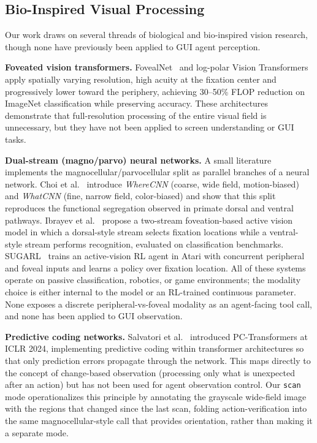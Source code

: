 \documentclass[11pt,a4paper]{article}
\begin{document}
\subsection{Bio-Inspired Visual Processing}
\label{sec:rw-bio-inspired}

Our work draws on several threads of biological and bio-inspired vision research, though none have previously been applied to GUI agent perception.

\textbf{Foveated vision transformers.} FovealNet~\cite{fovealnet} and log-polar Vision Transformers~\cite{logpolar-vit} apply spatially varying resolution, high acuity at the fixation center and progressively lower toward the periphery, achieving 30--50\% FLOP reduction on ImageNet classification while preserving accuracy. These architectures demonstrate that full-resolution processing of the entire visual field is unnecessary, but they have not been applied to screen understanding or GUI tasks.

\textbf{Dual-stream (magno/parvo) neural networks.} A small literature implements the magnocellular/parvocellular split as parallel branches of a neural network. Choi et al.~\cite{choi-dualstream-neurips23} introduce \emph{WhereCNN} (coarse, wide field, motion-biased) and \emph{WhatCNN} (fine, narrow field, color-biased) and show that this split reproduces the functional segregation observed in primate dorsal and ventral pathways. Ibrayev et al.~\cite{ibrayev-twostream-foveation} propose a two-stream foveation-based active vision model in which a dorsal-style stream selects fixation locations while a ventral-style stream performs recognition, evaluated on classification benchmarks. SUGARL~\cite{sugarl} trains an active-vision RL agent in Atari with concurrent peripheral and foveal inputs and learns a policy over fixation location. All of these systems operate on passive classification, robotics, or game environments; the modality choice is either internal to the model or an RL-trained continuous parameter. None exposes a discrete peripheral-vs-foveal modality as an agent-facing tool call, and none has been applied to GUI observation.

\textbf{Predictive coding networks.} Salvatori et al.~\cite{salvatori-pctransformers} introduced PC-Transformers at ICLR 2024, implementing predictive coding within transformer architectures so that only prediction errors propagate through the network. This maps directly to the concept of change-based observation (processing only what is unexpected after an action) but has not been used for agent observation control. Our \texttt{scan} mode operationalizes this principle by annotating the grayscale wide-field image with the regions that changed since the last scan, folding action-verification into the same magnocellular-style call that provides orientation, rather than making it a separate mode.
\end{document}
